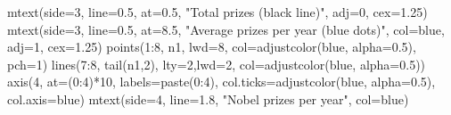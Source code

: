 \documentclass[
  10pt,
  b5paper]{book}
\newenvironment{Shaded}{\begin{snugshade}}{\end{snugshade}}
\newcommand{\AttributeTok}[1]{\textcolor[rgb]{0.77,0.63,0.00}{#1}}
\newcommand{\DecValTok}[1]{\textcolor[rgb]{0.00,0.00,0.81}{#1}}
\newcommand{\FloatTok}[1]{\textcolor[rgb]{0.00,0.00,0.81}{#1}}
\newcommand{\FunctionTok}[1]{\textcolor[rgb]{0.00,0.00,0.00}{#1}}
\newcommand{\NormalTok}[1]{#1}
\newcommand{\SpecialCharTok}[1]{\textcolor[rgb]{0.00,0.00,0.00}{#1}}
\newcommand{\StringTok}[1]{\textcolor[rgb]{0.31,0.60,0.02}{#1}}
\begin{document}
\begin{Shaded}
\begin{Highlighting}[]
\FunctionTok{mtext}\NormalTok{(}\AttributeTok{side=}\DecValTok{3}\NormalTok{, }\AttributeTok{line=}\FloatTok{0.5}\NormalTok{, }\AttributeTok{at=}\FloatTok{0.5}\NormalTok{, }\StringTok{"Total prizes (black line)"}\NormalTok{, }\AttributeTok{adj=}\DecValTok{0}\NormalTok{, }\AttributeTok{cex=}\FloatTok{1.25}\NormalTok{)}
\FunctionTok{mtext}\NormalTok{(}\AttributeTok{side=}\DecValTok{3}\NormalTok{, }\AttributeTok{line=}\FloatTok{0.5}\NormalTok{, }\AttributeTok{at=}\FloatTok{8.5}\NormalTok{, }\StringTok{"Average prizes per year (blue dots)"}\NormalTok{, }\AttributeTok{col=}\StringTok{\textquotesingle{}blue\textquotesingle{}}\NormalTok{, }\AttributeTok{adj=}\DecValTok{1}\NormalTok{, }\AttributeTok{cex=}\FloatTok{1.25}\NormalTok{)}
\FunctionTok{points}\NormalTok{(}\DecValTok{1}\SpecialCharTok{:}\DecValTok{8}\NormalTok{, n1, }\AttributeTok{lwd=}\DecValTok{8}\NormalTok{, }\AttributeTok{col=}\FunctionTok{adjustcolor}\NormalTok{(}\StringTok{\textquotesingle{}blue\textquotesingle{}}\NormalTok{, }\AttributeTok{alpha=}\FloatTok{0.5}\NormalTok{), }\AttributeTok{pch=}\DecValTok{1}\NormalTok{)}
\FunctionTok{lines}\NormalTok{(}\DecValTok{7}\SpecialCharTok{:}\DecValTok{8}\NormalTok{, }\FunctionTok{tail}\NormalTok{(n1,}\DecValTok{2}\NormalTok{), }\AttributeTok{lty=}\DecValTok{2}\NormalTok{,}\AttributeTok{lwd=}\DecValTok{2}\NormalTok{, }\AttributeTok{col=}\FunctionTok{adjustcolor}\NormalTok{(}\StringTok{\textquotesingle{}blue\textquotesingle{}}\NormalTok{, }\AttributeTok{alpha=}\FloatTok{0.5}\NormalTok{))}
\FunctionTok{axis}\NormalTok{(}\DecValTok{4}\NormalTok{, }\AttributeTok{at=}\NormalTok{(}\DecValTok{0}\SpecialCharTok{:}\DecValTok{4}\NormalTok{)}\SpecialCharTok{*}\DecValTok{10}\NormalTok{, }\AttributeTok{labels=}\FunctionTok{paste}\NormalTok{(}\DecValTok{0}\SpecialCharTok{:}\DecValTok{4}\NormalTok{), }\AttributeTok{col.ticks=}\FunctionTok{adjustcolor}\NormalTok{(}\StringTok{\textquotesingle{}blue\textquotesingle{}}\NormalTok{, }\AttributeTok{alpha=}\FloatTok{0.5}\NormalTok{), }\AttributeTok{col.axis=}\StringTok{\textquotesingle{}blue\textquotesingle{}}\NormalTok{)}
\FunctionTok{mtext}\NormalTok{(}\AttributeTok{side=}\DecValTok{4}\NormalTok{, }\AttributeTok{line=}\FloatTok{1.8}\NormalTok{, }\StringTok{"Nobel prizes per year"}\NormalTok{, }\AttributeTok{col=}\StringTok{\textquotesingle{}blue\textquotesingle{}}\NormalTok{)}
\end{Highlighting}
\end{Shaded}
\end{document}
